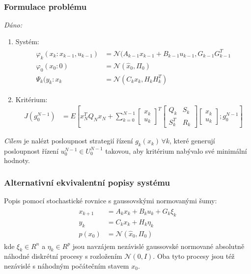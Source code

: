 \subsubsection*{Formulace problému}
\textit{Dáno:}
\begin{enumerate}
\item Systém: 
\begin{align*}
\begin{split}
\varphi_{k}(x_k : x_{k-1}, u_{k-1}) &= \mathscr{N}(A_{k-1}x_{k-1} + B_{k-1} u_{k-1}, G_{k-1}G_{k-1}^T \\
\varphi_0(x_0: 0) &= \mathscr{N}(\hat{x}_0, \Pi_0) \\
\Psi_k(y_k: x_k &= \mathscr{N}(C_kx_k, H_kH_k^T)
\end{split}
\end{align*}
\item Kritérium:
\begin{align*}
J(g_0^{N-1}) &= E \left[ x_N^T Q_N x_N + \displaystyle{\sum_{k=0}^{N-1}} \begin{bmatrix} x_k \\ u_k \end{bmatrix}^T \begin{bmatrix} Q_k & S_k \\ S_k^T & R_k \end{bmatrix} \begin{bmatrix} x_k \\ u_k \end{bmatrix}; g_0^{N-1} \right]
\end{align*}
\end{enumerate}
\textit{Cílem} je nalézt posloupnost strategií řízení $ g_k(x_k) \, \forall k $, které generují posloupnost řízení $ u_0^{N-1} \in U_0^{N-1} $ takovou, aby kritérium nabývalo své minimální hodnoty.

\subsubsection*{Alternativní ekvivalentní popisy systému}
Popis pomocí stochastické rovnice s gaussovskými normovanými šumy:
\begin{align*}
\begin{split}
x_{k+1} &= A_k x_k + B_k u_k + G_k \xi_k \\
y_k &= C_k x_k + H_k \eta_k \\
p(x_0) &= \mathscr{N}(\hat{x}_0, \Pi_0)
\end{split}
\end{align*}
kde $ \xi_k \in R^n $ a $ \eta_k \in R^p $ jsou navzájem nezávislé gaussovské normované absolutně náhodné diskrétní procesy s rozložením $ \mathscr{N}(0, I) $. Oba tyto procesy jsou též nezávislé s náhodným počátečním stavem $ x_0 $.

